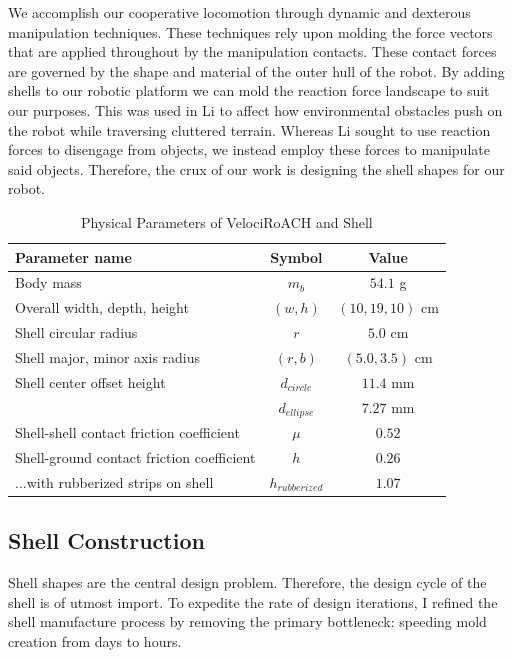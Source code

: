 \documentclass[letterpaper]{report}
\begin{document}

We accomplish our cooperative locomotion through dynamic and dexterous manipulation techniques.
These techniques rely upon molding the force vectors that are applied throughout by the manipulation contacts.
These contact forces are governed by the shape and material of the outer hull of the robot.
By adding shells to our robotic platform we can mold the reaction force landscape to suit our purposes.
This was used in Li \cite{ChenTerradynamic} to affect how environmental obstacles push on the robot while traversing cluttered terrain.
Whereas Li sought to use reaction forces to disengage from objects, we instead employ these forces to manipulate said objects.
Therefore, the crux of our work is designing the shell shapes for our robot.

\begin{table}[tb]
\renewcommand{\arraystretch}{1.1}
\caption{Physical Parameters of VelociRoACH and Shell}
\label{tab:Dimensions1}
\centering
\begin{tabular}{l c c}
\hline
Parameter name & Symbol & Value \\
\hline
Body mass & $m_b$ & $54.1$ g \\
Overall width, depth, height & $(w, h)$ & $(10, 19, 10)$ cm \\
Shell circular radius & $r$ & $5.0$ cm \\
Shell major, minor axis radius & $(r, b)$ & $(5.0, 3.5)$ cm \\
Shell center offset height & $d_{circle}$ & $11.4$ mm \\
                           & $d_{ellipse}$ & $7.27$ mm \\
Shell-shell contact friction coefficient & $\mu$ & $0.52$ \\
Shell-ground contact friction coefficient & $h$ & $0.26$ \\
...with rubberized strips on shell  & $h_{rubberized}$ & $1.07$ \\
\hline
\end{tabular}
\end{table}

\subsection{Shell Construction}
Shell shapes are the central design problem. Therefore, the design cycle of the shell is of utmost import.
To expedite the rate of design iterations, I refined the shell manufacture process by removing the primary bottleneck: speeding mold creation from days to hours.
\end{document}
